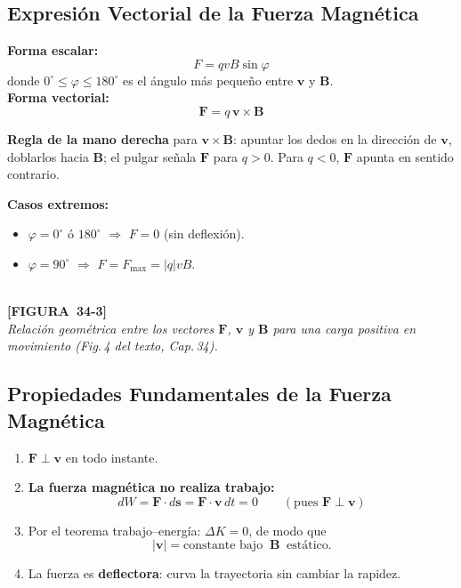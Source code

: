 \documentclass[12pt, letterpaper]{report}
\numberwithin{equation}{section}
\newcommand{\vB}[1]{\boldsymbol{#1}}          %
\newcommand{\figplaceholder}[2]{%
  \begin{tcolorbox}[figbox]
    \centering
    \textcolor{NavyBlue!50}{\rule{0pt}{2.8cm}}\\[4pt]
    {\small\color{NavyBlue}\textbf{[FIGURA\ #1]}\\[2pt]
    \textit{#2}}
  \end{tcolorbox}
}
\begin{document}
\subsection{Expresión Vectorial de la Fuerza Magnética}

\begin{tcolorbox}[defbox, title=Fuerza magnética — Forma escalar y vectorial]
  \textbf{Forma escalar:}
  \begin{equation}
    \boxed{F = qvB\sin\varphi}
    \label{eq:Fmagescalar}
  \end{equation}
  donde $0^\circ\le\varphi\le180^\circ$ es el ángulo más pequeño entre
  $\vB{v}$ y $\vB{B}$.\\[6pt]
  \textbf{Forma vectorial:}
  \begin{equation}
    \boxed{\vB{F} = q\,\vB{v}\times\vB{B}}
    \label{eq:Fmagvect}
  \end{equation}
\end{tcolorbox}

\textbf{Regla de la mano derecha} para $\vB{v}\times\vB{B}$: apuntar los
dedos en la dirección de $\vB{v}$, doblarlos hacia $\vB{B}$; el pulgar
señala $\vB{F}$ para $q>0$. Para $q<0$, $\vB{F}$ apunta en sentido
contrario.

\textbf{Casos extremos:}
\begin{itemize}[leftmargin=1.8em, itemsep=2pt]
  \item $\varphi=0^\circ$ ó $180^\circ$ $\Rightarrow$
        $F=0$ (sin deflexión).
  \item $\varphi=90^\circ$ $\Rightarrow$
        $F=F_{\max}=|q|vB$.
\end{itemize}

\figplaceholder{34-3}{Relación geométrica entre los vectores $\vB{F}$,
$\vB{v}$ y $\vB{B}$ para una carga positiva en movimiento
(Fig.\,4 del texto, Cap.\,34).}

\subsection{Propiedades Fundamentales de la Fuerza Magnética}

\begin{tcolorbox}[propbox, title=Propiedades esenciales]
  \begin{enumerate}[leftmargin=1.5em, itemsep=4pt]
    \item $\vB{F}\perp\vB{v}$ en todo instante.
    \item \textbf{La fuerza magnética no realiza trabajo:}
      \[
        dW = \vB{F}\cdot d\vB{s} = \vB{F}\cdot\vB{v}\,dt
           = 0 \qquad (\text{pues }\vB{F}\perp\vB{v})
      \]
    \item Por el teorema trabajo–energía: $\Delta K=0$, de modo que
      \[
        |\vB{v}| = \text{constante bajo }\ \vB{B}\ \text{ estático.}
      \]
    \item La fuerza es \textbf{deflectora}: curva la trayectoria sin
          cambiar la rapidez.
  \end{enumerate}
\end{tcolorbox}
\end{document}
